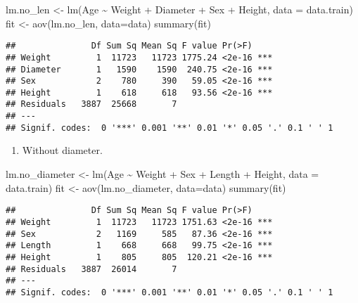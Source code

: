 \documentclass[
]{article}
\newenvironment{Shaded}{\begin{snugshade}}{\end{snugshade}}
\newcommand{\AttributeTok}[1]{\textcolor[rgb]{0.77,0.63,0.00}{#1}}
\newcommand{\FunctionTok}[1]{\textcolor[rgb]{0.00,0.00,0.00}{#1}}
\newcommand{\NormalTok}[1]{#1}
\newcommand{\OtherTok}[1]{\textcolor[rgb]{0.56,0.35,0.01}{#1}}
\newcommand{\SpecialCharTok}[1]{\textcolor[rgb]{0.00,0.00,0.00}{#1}}
\providecommand{\tightlist}{%
  \setlength{\itemsep}{0pt}\setlength{\parskip}{0pt}}
\begin{document}
\begin{Shaded}
\begin{Highlighting}[]
\NormalTok{lm.no\_len }\OtherTok{\textless{}{-}} \FunctionTok{lm}\NormalTok{(Age }\SpecialCharTok{\textasciitilde{}}\NormalTok{ Weight }\SpecialCharTok{+}\NormalTok{ Diameter }\SpecialCharTok{+}\NormalTok{ Sex }\SpecialCharTok{+}\NormalTok{ Height, }\AttributeTok{data =}\NormalTok{ data.train)}
\NormalTok{fit }\OtherTok{\textless{}{-}} \FunctionTok{aov}\NormalTok{(lm.no\_len, }\AttributeTok{data=}\NormalTok{data)}
\FunctionTok{summary}\NormalTok{(fit)}
\end{Highlighting}
\end{Shaded}

\begin{verbatim}
##               Df Sum Sq Mean Sq F value Pr(>F)    
## Weight         1  11723   11723 1775.24 <2e-16 ***
## Diameter       1   1590    1590  240.75 <2e-16 ***
## Sex            2    780     390   59.05 <2e-16 ***
## Height         1    618     618   93.56 <2e-16 ***
## Residuals   3887  25668       7                   
## ---
## Signif. codes:  0 '***' 0.001 '**' 0.01 '*' 0.05 '.' 0.1 ' ' 1
\end{verbatim}

\begin{enumerate}
\def\labelenumi{\arabic{enumi}.}
\setcounter{enumi}{3}
\tightlist
\item
  Without diameter.
\end{enumerate}

\begin{Shaded}
\begin{Highlighting}[]
\NormalTok{lm.no\_diameter }\OtherTok{\textless{}{-}} \FunctionTok{lm}\NormalTok{(Age }\SpecialCharTok{\textasciitilde{}}\NormalTok{ Weight }\SpecialCharTok{+}\NormalTok{ Sex }\SpecialCharTok{+}\NormalTok{ Length }\SpecialCharTok{+}\NormalTok{ Height, }\AttributeTok{data =}\NormalTok{ data.train)}
\NormalTok{fit }\OtherTok{\textless{}{-}} \FunctionTok{aov}\NormalTok{(lm.no\_diameter, }\AttributeTok{data=}\NormalTok{data)}
\FunctionTok{summary}\NormalTok{(fit)}
\end{Highlighting}
\end{Shaded}

\begin{verbatim}
##               Df Sum Sq Mean Sq F value Pr(>F)    
## Weight         1  11723   11723 1751.63 <2e-16 ***
## Sex            2   1169     585   87.36 <2e-16 ***
## Length         1    668     668   99.75 <2e-16 ***
## Height         1    805     805  120.21 <2e-16 ***
## Residuals   3887  26014       7                   
## ---
## Signif. codes:  0 '***' 0.001 '**' 0.01 '*' 0.05 '.' 0.1 ' ' 1
\end{verbatim}
\end{document}
